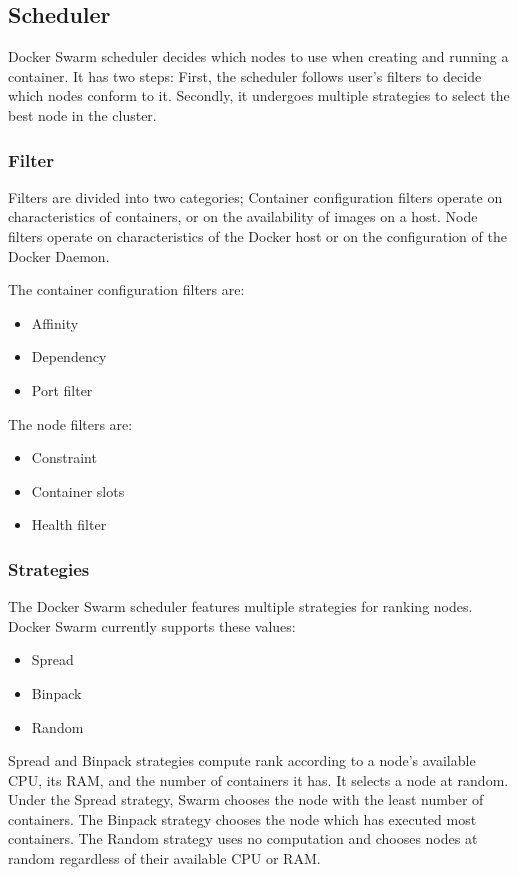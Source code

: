 \subsection{Scheduler}
Docker Swarm scheduler decides which nodes to use when creating and running a container. It has two steps:
First, the scheduler follows user's filters to decide which nodes conform to it.
Secondly, it undergoes multiple strategies to select the best node in the cluster.

\subsubsection{Filter}
Filters are divided into two categories;
Container configuration filters operate on characteristics of containers, or on the availability of images on a host.
Node filters operate on characteristics of the Docker host or on the configuration of the Docker Daemon.

The container configuration filters are:
\begin{itemize}
    \item Affinity
    \item Dependency
    \item Port filter
\end{itemize}
The node filters are:
\begin{itemize}
    \item Constraint
    \item Container slots
    \item Health filter
\end{itemize}

\subsubsection{Strategies}
The Docker Swarm scheduler features multiple strategies for ranking nodes. Docker Swarm currently supports these values:
\begin{itemize}
    \item Spread
    \item Binpack
    \item Random
\end{itemize}
Spread and Binpack strategies compute rank according to a node’s available CPU, its RAM, and the number of containers it has. It selects a node at random.
Under the Spread strategy, Swarm chooses the node with the least number of containers.
The Binpack strategy chooses the node which has executed most containers.
The Random strategy uses no computation and chooses nodes at random regardless of their available CPU or RAM.

